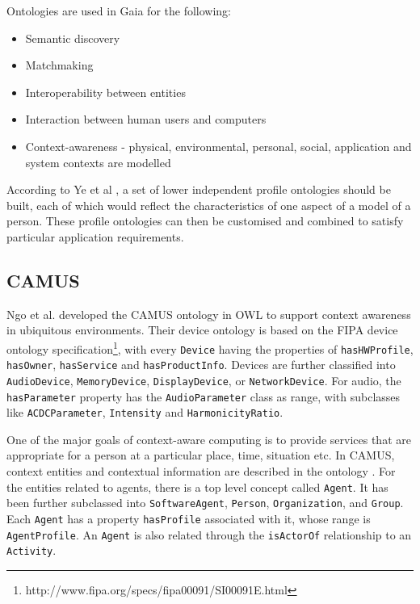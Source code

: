 Ontologies are used in Gaia for the following:

\begin{itemize}
	\item Semantic discovery
	\item Matchmaking
	\item Interoperability between entities
	\item Interaction between human users and computers
	\item Context-awareness - physical, environmental, personal, social, application and system contexts are modelled
\end{itemize}

According to Ye et al \cite{Ye2007}, a set of lower independent profile ontologies should be built, each of which would reflect the characteristics of one aspect of a model of a person. These profile ontologies can then be customised and combined to satisfy particular application requirements.



\subsection{CAMUS}

Ngo et al. \cite{Ngo2004} developed the \ac{CAMUS} ontology in \ac{OWL} to support context awareness in ubiquitous environments. Their device ontology is based on the \ac{FIPA} device ontology specification\footnote{http://www.fipa.org/specs/fipa00091/SI00091E.html}, with every \texttt{Device} having the properties of \texttt{hasHWProfile}, \texttt{hasOwner}, \texttt{hasService} and \texttt{hasProductInfo}. Devices are further classified into \texttt{AudioDevice}, \texttt{MemoryDevice}, \texttt{DisplayDevice}, or \texttt{NetworkDevice}. For audio, the \texttt{hasParameter} property has the \texttt{Audio\-Parameter} class as range, with subclasses like \texttt{ACDC\-Parameter}, \texttt{In\-ten\-si\-ty} and \texttt{Harmonicity\-Ratio}. %

One of the major goals of context-aware computing is to provide services that are appropriate for a person at a particular place, time, situation etc. In \ac{CAMUS}, context entities and contextual information are described in the ontology \cite{Ngo2004}. For the entities related to agents, there is a top level concept called \texttt{Agent}. It has been further subclassed into \texttt{SoftwareAgent}, \texttt{Person}, \texttt{Organization}, and \texttt{Group}. Each \texttt{Agent} has a property \texttt{hasProfile} associated with it, whose range is \texttt{AgentProfile}. An \texttt{Agent} is also related through the \texttt{isActorOf} relationship to an \texttt{Activity}. %

